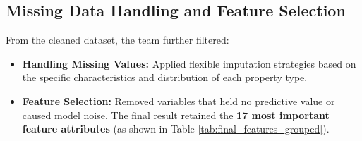 \documentclass[12pt, a4paper]{article}
\begin{document}
\subsection{Missing Data Handling and Feature Selection}
From the cleaned dataset, the team further filtered:
\begin{itemize}[noitemsep, topsep=0pt]
    \item \textbf{Handling Missing Values:} Applied flexible imputation strategies based on the specific characteristics and distribution of each property type.
    \item \textbf{Feature Selection:} Removed variables that held no predictive value or caused model noise. The final result retained the \textbf{17 most important feature attributes} (as shown in Table \ref{tab:final_features_grouped}).
\end{itemize}
\end{document}
